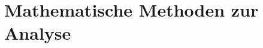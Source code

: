 \documentclass[main.tex]{subfiles}
\begin{document}
\section{Mathematische Methoden zur Analyse}
\end{document}
